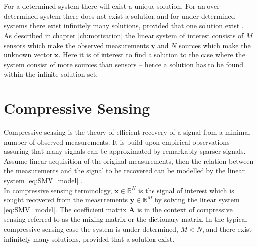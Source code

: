\\ \\
For a determined system there will exist a unique solution.
For an over-determined system there does not exist a solution and for under-determined systems there exist infinitely many solutions, provided that one solution exist \cite[p. ix]{CS}.
\\ 
As described in chapter \ref{ch:motivation} the linear system of interest consists of $M$ sensors which make the observed measurements $\mathbf{y}$ and $N$ sources which make the unknown vector $\mathbf{x}$. 
Here it is of interest to find a solution to the case where the system consist of more sources than sensors -- hence a solution has to be found within the infinite solution set.

\section{Compressive Sensing}\label{sec:CS}
Compressive sensing is the theory of efficient recovery of a signal from a minimal number of observed measurements. 
It is build upon empirical observations assuring that many signals can be approximated by remarkably sparser signals.   
Assume linear acquisition of the original measurements, then the relation between the measurements and the signal to be recovered can be modelled by the linear system \eqref{eq:SMV_model} \cite{FR}.  
\\ 
In compressive sensing terminology, $\mathbf{x} \in \mathbb{R}^N$ is the signal of interest which is sought recovered from the measurements $\mathbf{y} \in \mathbb{R}^M$ by solving the linear system \eqref{eq:SMV_model}. 
The coefficient matrix $\mathbf{A}$ is in the context of compressive sensing referred to as the mixing matrix or the dictionary matrix.  
In the typical compressive sensing case the system is under-determined, $M < N$,  and there exist infinitely many solutions, provided that a solution exist.
